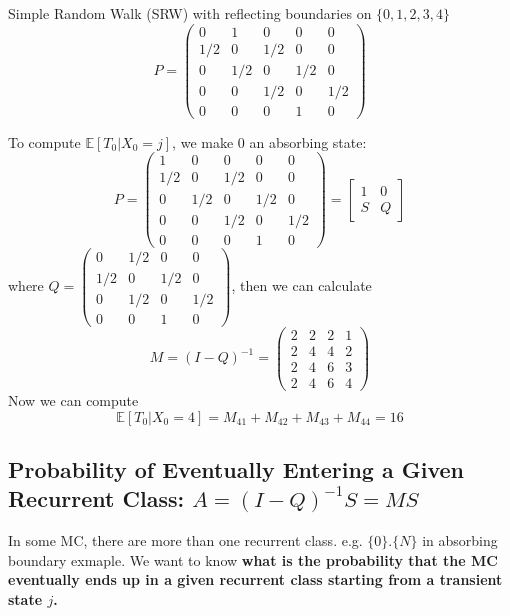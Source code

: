 \documentclass[11pt]{elegantbook}
\begin{document}
\begin{example}
    Simple Random Walk (SRW) with reflecting boundaries on $\{0,1,2,3,4\}$
    $$P=\left(\begin{array}{ccccc}
    0 & 1 & 0 & 0 & 0 \\
    1 / 2 & 0 & 1 / 2 & 0 & 0 \\
    0 & 1 / 2 & 0 & 1 / 2 & 0 \\
    0 & 0 & 1 / 2 & 0 & 1 / 2 \\
    0 & 0 & 0 & 1 & 0
    \end{array}\right)$$
\end{example}
To compute $\mathbb{E}[T_0|X_0=j]$, we make $0$ an absorbing state:
$$P=\left(\begin{array}{ccccc}
    1 & 0 & 0 & 0 & 0 \\
    1 / 2 & 0 & 1 / 2 & 0 & 0 \\
    0 & 1 / 2 & 0 & 1 / 2 & 0 \\
    0 & 0 & 1 / 2 & 0 & 1 / 2 \\
    0 & 0 & 0 & 1 & 0
    \end{array}\right)=\begin{bmatrix}
        1&	0\\
        S&	Q
    \end{bmatrix}$$
where $Q=\left(\begin{array}{ccccc}
    0 & 1 / 2 & 0 & 0 \\
    1 / 2 & 0 & 1 / 2 & 0 \\
    0 & 1 / 2 & 0 & 1 / 2 \\
    0 & 0 & 1 & 0
    \end{array}\right)$, then we can calculate $$M=(I-Q)^{-1}=\left(\begin{array}{ccccc}
        2 & 2 & 2 & 1 \\
        2 & 4 & 4 & 2 \\
        2 & 4 & 6 & 3 \\
        2 & 4 & 6 & 4
        \end{array}\right)$$
Now we can compute $$\mathbb{E}[T_0|X_0=4]=M_{41}+M_{42}+M_{43}+M_{44}=16$$

\subsection{Probability of Eventually Entering a Given Recurrent Class: $A=(I-Q)^{-1}S=MS$}
In some MC, there are more than one recurrent class. e.g. $\{0\}.\{N\}$ in absorbing boundary exmaple. We want to know \textbf{what is the probability that the MC eventually ends up in a given recurrent class starting from a transient state $j$.}
\end{document}
